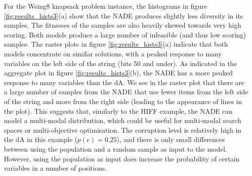\documentclass[twoside]{article}
\begin{document}
For the Weing8 knapsack problem instance, the histograms in figure \ref{fig:results_hists3}(a) show that the NADE produces slightly less diversity in its samples. The fitnesses of the samples are also heavily skewed towards very high scoring. Both models produce a large number of infeasible (and thus low scoring) samples. The raster plots in figure \ref{fig:results_hists3}(a) indicate that both models concentrate on similar solutions, with a peaked response to many variables on the left side of the string (bits 50 and under). As indicated in the aggregate plot in figure \ref{fig:results_hists3}(b), the NADE has a more peaked response to many variables than the dA. We see in the raster plot that there are a large number of samples from the NADE that use fewer items from the left side of the string and more from the right side (leading to the appearance of lines in the plot). This suggests that, similarly to the HIFF example, the NADE can model a multi-modal distribution, which could be useful for multi-modal search spaces or multi-objective optimisation. The corruption level is relatively high in the dA in this example (\(p(c)=0.25\)), and there is only small differences between using the population and a random sample as input to the model. However, using the population as input does increase the probability of certain variables in a number of positions.
 
\end{document}
